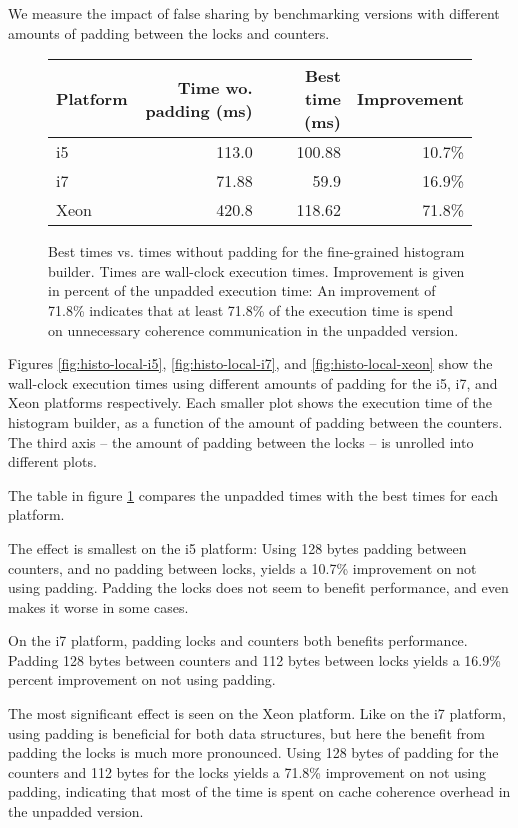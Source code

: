 We measure the impact of false sharing by benchmarking versions with different
amounts of padding between the locks and counters.

\begin{figure}[hbtp]
	\centering
	\begin{tabular}{l r r r}
		\hline
		\hline
		Platform & Time wo. padding (ms) & Best time (ms) & Improvement \\
		\hline
		i5 & 113.0 & 100.88 & 10.7\% \\
		i7 & 71.88 & 59.9 & 16.9\% \\
		Xeon & 420.8 & 118.62 & 71.8\% \\
		\hline
		\hline
	\end{tabular}
	\caption{Best times vs. times without padding for the fine-grained
	histogram builder. Times are wall-clock execution times. Improvement is
	given in percent of the unpadded execution time: An improvement of
	71.8\% indicates that at least 71.8\% of the execution time is spend on
	unnecessary coherence communication in the unpadded version.}
	\label{table:hist-local}
\end{figure}

Figures \ref{fig:histo-local-i5}, \ref{fig:histo-local-i7}, and
\ref{fig:histo-local-xeon} show the wall-clock execution times using different
amounts of padding for the i5, i7, and Xeon platforms respectively. Each smaller
plot shows the execution time of the histogram builder, as a function of the
amount of padding between the counters. The third axis -- the amount of padding
between the locks -- is unrolled into different plots.

The table in figure \ref{table:hist-local} compares the unpadded times with the
best times for each platform.

The effect is smallest on the i5 platform: Using 128 bytes padding between
counters, and no padding between locks, yields a 10.7\% improvement on not using
padding. Padding the locks does not seem to benefit performance, and even makes
it worse in some cases.

On the i7 platform, padding locks and counters both benefits performance.
Padding 128 bytes between counters and 112 bytes between locks yields a 16.9\%
percent improvement on not using padding.

The most significant effect is seen on the Xeon platform. Like on the i7
platform, using padding is beneficial for both data structures, but here the
benefit from padding the locks is much more pronounced. Using 128 bytes of
padding for the counters and 112 bytes for the locks yields a 71.8\% improvement
on not using padding, indicating that most of the time is spent on cache
coherence overhead in the unpadded version.

